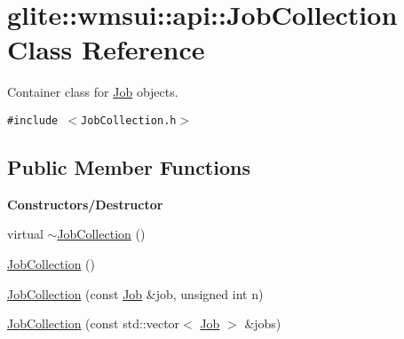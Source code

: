 \hypertarget{classglite_1_1wmsui_1_1api_1_1JobCollection}{
\section{glite::wmsui::api::Job\-Collection Class Reference}
\label{classglite_1_1wmsui_1_1api_1_1JobCollection}
}
Container class for \hyperlink{classglite_1_1wmsui_1_1api_1_1Job}{Job} objects.  


{\tt \#include $<$Job\-Collection.h$>$}

\subsection*{Public Member Functions}
\begin{Indent}{\bf Constructors/Destructor}\par
\begin{CompactItemize}
\item 
virtual \hyperlink{classglite_1_1wmsui_1_1api_1_1JobCollection_z1_0}{$\sim$Job\-Collection} ()
\item 
\hyperlink{classglite_1_1wmsui_1_1api_1_1JobCollection_z1_1}{Job\-Collection} ()
\item 
\hyperlink{classglite_1_1wmsui_1_1api_1_1JobCollection_z1_2}{Job\-Collection} (const \hyperlink{classglite_1_1wmsui_1_1api_1_1Job}{Job} \&job, unsigned int n)
\item 
\hyperlink{classglite_1_1wmsui_1_1api_1_1JobCollection_z1_3}{Job\-Collection} (const std::vector$<$ \hyperlink{classglite_1_1wmsui_1_1api_1_1Job}{Job} $>$ \&jobs)
\end{CompactItemize}
\end{Indent}
